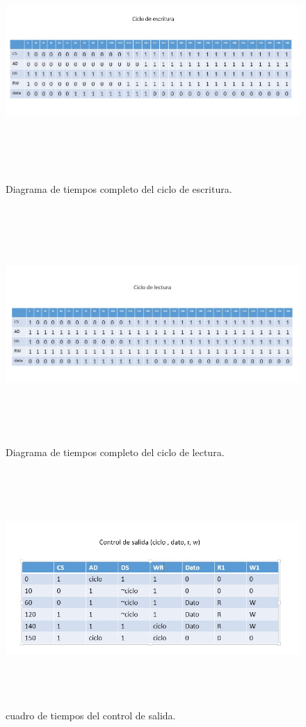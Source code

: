 \documentclass[12pt,a4paper]{article}
\begin{document}
\begin{figure}[htbp]
	\centering
	\includegraphics[height=9cm, width=16cm]{img/diagramatiempoescritura.jpg}
	\caption[3erNivel]{Diagrama de tiempos completo del ciclo de escritura.}
	\label{fig:DTE}
\end{figure}
\begin{figure}[htbp]
	\centering
	\includegraphics[height=9cm, width=16cm]{img/diagramatiempolectura.jpg}
	\caption[3erNivel]{Diagrama de tiempos completo del ciclo de lectura.}
	\label{fig:DTL}
\end{figure}
\begin{figure}[htbp]
	\centering
	\includegraphics[height=9cm, width=16cm]{img/cuadrotiemposalida.jpg}
	\caption[3erNivel]{cuadro de tiempos del control de salida.}
	\label{fig:CTS}
\end{figure}
\end{document}
